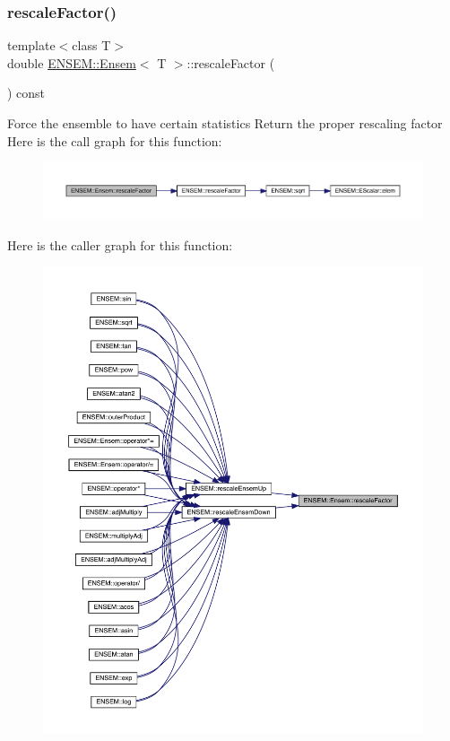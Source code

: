 \subsubsection{\texorpdfstring{rescaleFactor()}{rescaleFactor()}\hspace{0.1cm}{\footnotesize\ttfamily [2/3]}}
{\footnotesize\ttfamily template$<$class T$>$ \\
double \mbox{\hyperlink{classENSEM_1_1Ensem}{E\+N\+S\+E\+M\+::\+Ensem}}$<$ T $>$\+::rescale\+Factor (\begin{DoxyParamCaption}{ }\end{DoxyParamCaption}) const\hspace{0.3cm}{\ttfamily [inline]}}

Force the ensemble to have certain statistics Return the proper rescaling factor Here is the call graph for this function\+:
\nopagebreak
\begin{figure}[H]
\begin{center}
\leavevmode
\includegraphics[width=350pt]{d7/d3e/classENSEM_1_1Ensem_aecf90199daafa73454e9c1aceef313a4_cgraph}
\end{center}
\end{figure}
Here is the caller graph for this function\+:
\nopagebreak
\begin{figure}[H]
\begin{center}
\leavevmode
\includegraphics[width=350pt]{d7/d3e/classENSEM_1_1Ensem_aecf90199daafa73454e9c1aceef313a4_icgraph}
\end{center}
\end{figure}
